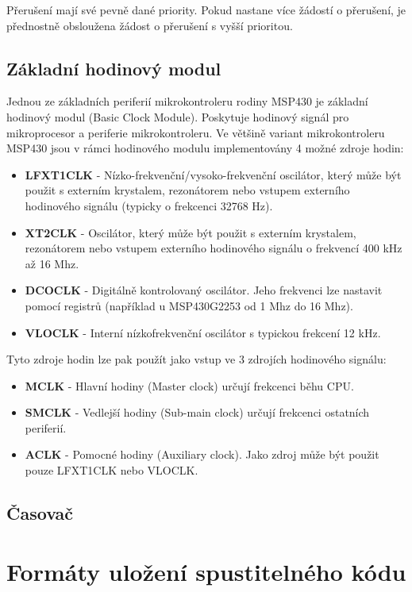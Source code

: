 Přerušení mají své pevně dané priority. Pokud nastane více žádostí o přerušení, je přednostně obsloužena žádost o přerušení s vyšší prioritou.

\section{Základní hodinový modul}

Jednou ze základních periferií mikrokontroleru rodiny MSP430 je základní hodinový modul (Basic Clock Module). Poskytuje hodinový signál pro mikroprocesor a periferie mikrokontroleru. Ve většině variant mikrokontroleru MSP430 jsou v rámci hodinového modulu implementovány 4 možné zdroje hodin:

\begin{itemize}
\item \textbf{LFXT1CLK} - Nízko-frekvenční/vysoko-frekvenční oscilátor, který může být použit s externím krystalem, rezonátorem nebo vstupem externího hodinového signálu (typicky o frekcenci 32768 Hz).
\item \textbf{XT2CLK} - Oscilátor, který může být použit s externím krystalem, rezonátorem nebo vstupem externího hodinového signálu o frekvencí 400 kHz až 16 Mhz.
\item \textbf{DCOCLK} - Digitálně kontrolovaný oscilátor. Jeho frekvenci lze nastavit pomocí registrů (například u MSP430G2253 od 1 Mhz do 16 Mhz).
\item \textbf{VLOCLK} - Interní nízkofrekvenční oscilátor s typickou frekcení 12 kHz.
\end{itemize}

Tyto zdroje hodin lze pak použít jako vstup ve 3 zdrojích hodinového signálu:

\begin{itemize}
\item \textbf{MCLK} - Hlavní hodiny (Master clock) určují frekcenci běhu CPU.
\item \textbf{SMCLK} - Vedlejší hodiny (Sub-main clock) určují frekcenci ostatních periferií.
\item \textbf{ACLK} - Pomocné hodiny (Auxiliary clock). Jako zdroj může být použit pouze LFXT1CLK nebo VLOCLK.
\end{itemize}

\section{Časovač}

\chapter{Formáty uložení spustitelného kódu}

